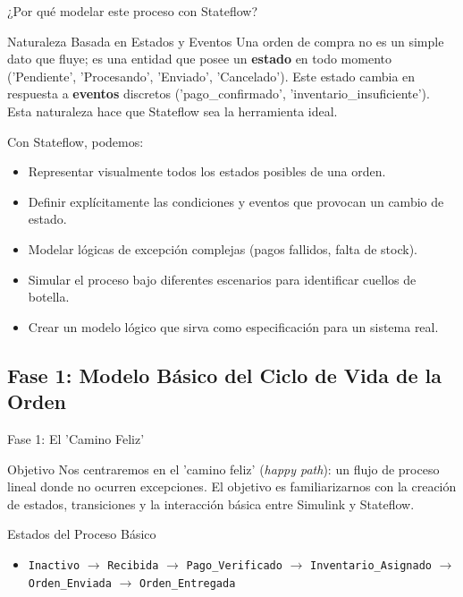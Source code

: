 \documentclass[aspectratio=169,xcolor=dvipsnames]{beamer}
\begin{document}
\begin{frame}{¿Por qué modelar este proceso con Stateflow?}
    \begin{block}{Naturaleza Basada en Estados y Eventos}
    Una orden de compra no es un simple dato que fluye; es una entidad que posee un \textbf{estado} en todo momento ('Pendiente', 'Procesando', 'Enviado', 'Cancelado'). Este estado cambia en respuesta a \textbf{eventos} discretos ('pago\_confirmado', 'inventario\_insuficiente'). Esta naturaleza hace que Stateflow sea la herramienta ideal.
    \end{block}
    
    \begin{alertblock}{Con Stateflow, podemos:}
        \begin{itemize}
            \item Representar visualmente todos los estados posibles de una orden.
            \item Definir explícitamente las condiciones y eventos que provocan un cambio de estado.
            \item Modelar lógicas de excepción complejas (pagos fallidos, falta de stock).
            \item Simular el proceso bajo diferentes escenarios para identificar cuellos de botella.
            \item Crear un modelo lógico que sirva como especificación para un sistema real.
        \end{itemize}
    \end{alertblock}
\end{frame}

\subsection{Fase 1: Modelo Básico del Ciclo de Vida de la Orden}

\begin{frame}{Fase 1: El 'Camino Feliz'}

    \begin{block}{Objetivo}
    Nos centraremos en el 'camino feliz' (\textit{happy path}): un flujo de proceso lineal donde no ocurren excepciones. El objetivo es familiarizarnos con la creación de estados, transiciones y la interacción básica entre Simulink y Stateflow.
    \end{block}
    
    \begin{alertblock}{Estados del Proceso Básico}
        \begin{itemize}
            \item \texttt{Inactivo} $\rightarrow$ \texttt{Recibida} $\rightarrow$ \texttt{Pago\_Verificado} $\rightarrow$ \texttt{Inventario\_Asignado} $\rightarrow$ \texttt{Orden\_Enviada} $\rightarrow$ \texttt{Orden\_Entregada}
        \end{itemize}
    \end{alertblock}
\end{frame}
\end{document}
